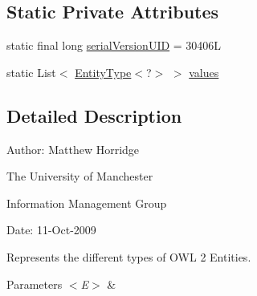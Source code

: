 \subsection*{Static Private Attributes}
\begin{DoxyCompactItemize}
\item 
static final long \hyperlink{classorg_1_1semanticweb_1_1owlapi_1_1model_1_1_entity_type_3_01_e_01extends_01_o_w_l_entity_01_4_a511f9d80f90ea1ba5c8899acb7018a5b}{serial\-Version\-U\-I\-D} = 30406\-L
\item 
static List$<$ \hyperlink{classorg_1_1semanticweb_1_1owlapi_1_1model_1_1_entity_type_3_01_e_01extends_01_o_w_l_entity_01_4_a69573aa3044dd02aabd1c8bac00cb4e6}{Entity\-Type}$<$?$>$ $>$ \hyperlink{classorg_1_1semanticweb_1_1owlapi_1_1model_1_1_entity_type_3_01_e_01extends_01_o_w_l_entity_01_4_ab9b5dbcdb74ae8cfd603d30521ff3ef7}{values}
\end{DoxyCompactItemize}


\subsection{Detailed Description}
Author\-: Matthew Horridge\par
 The University of Manchester\par
 Information Management Group\par
 Date\-: 11-\/\-Oct-\/2009 

Represents the different types of O\-W\-L 2 Entities.


\begin{DoxyParams}{Parameters}
{\em $<$\-E$>$} & \\
\hline
\end{DoxyParams}


